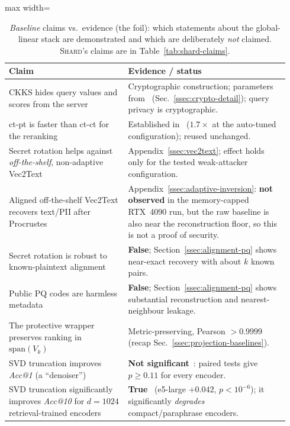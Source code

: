 \begin{table}[tbp]
\begin{singlespace}
\centering
\caption{\emph{Baseline} claims vs.\ evidence (the foil): which statements
about the global-linear stack are demonstrated and which are deliberately
\emph{not} claimed. \textsc{Shard}'s claims are in
Table~\ref{tab:shard-claims}.}
\label{tab:claims}
\small
\begin{adjustbox}{max width=\linewidth}
\begin{tabular}{@{}p{0.40\linewidth}p{0.54\linewidth}@{}}
\toprule
\textbf{Claim} & \textbf{Evidence / status} \\ \midrule
CKKS hides query values and scores from the server &
Cryptographic construction; parameters from~\cite{ref_alpha}
(Sec.~\ref{ssec:crypto-detail}); query privacy is cryptographic. \\
ct-pt is faster than ct-ct for the reranking &
Established in~\cite{ref_alpha} ($1.7\times$ at the auto-tuned
configuration); reused unchanged. \\
Secret rotation helps against \emph{off-the-shelf}, non-adaptive
Vec2Text & Appendix~\ref{ssec:vec2text}; effect holds only for the
tested weak-attacker configuration. \\
Aligned off-the-shelf Vec2Text recovers text/PII after Procrustes &
Appendix~\ref{ssec:adaptive-inversion}: \textbf{not observed} in the
memory-capped RTX~4090 run, but the raw baseline is also near the
reconstruction floor, so this is not a proof of security. \\
Secret rotation is robust to known-plaintext alignment &
\textbf{False}; Section~\ref{ssec:alignment-pq} shows near-exact
recovery with about $k$ known pairs. \\
Public PQ codes are harmless metadata &
\textbf{False}; Section~\ref{ssec:alignment-pq} shows substantial
reconstruction and nearest-neighbour leakage. \\
The protective wrapper preserves ranking in $\mathrm{span}(V_k)$ &
Metric-preserving, Pearson $>0.9999$~\cite{ref_alpha} (recap Sec.~\ref{ssec:projection-baselines}). \\
SVD truncation improves \emph{Acc@1} (a ``denoiser'') &
\textbf{Not significant}~\cite{ref_alpha}: paired tests give
$p\geq0.11$ for every encoder. \\
SVD truncation significantly improves \emph{Acc@10} for $d{=}1024$
retrieval-trained encoders &
\textbf{True}~\cite{ref_alpha} (e5-large $+0.042$, $p<10^{-6}$); it
significantly \emph{degrades} compact/paraphrase encoders. \\

\end{tabular}
\end{adjustbox}
\end{singlespace}
\end{table}
